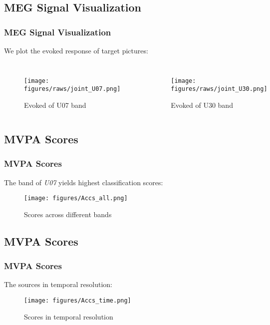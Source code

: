 \documentclass[aspectratio=169]{beamer}
\begin{document}
\subsection{MEG Signal Visualization}
\begin{frame}
    \frametitle{MEG Signal Visualization}
    We plot the evoked response of target pictures:

    \begin{columns}
        \begin{figure}[h]
            \centering
            \texttt{[image: figures/raws/joint\_U07.png]}
            \caption{Evoked of U07 band}
        \end{figure}

        \begin{figure}[!h]
            \centering
            \texttt{[image: figures/raws/joint\_U30.png]}
            \caption{Evoked of U30 band}
        \end{figure}

    \end{columns}

\end{frame}

\subsection{MVPA Scores}
\begin{frame}
    \frametitle{MVPA Scores}
    The band of \emph{U07} yields highest classification scores:
    \begin{figure}[h]
        \centering
        \texttt{[image: figures/Accs\_all.png]}
        \caption{Scores across different bands}
    \end{figure}
\end{frame}

\subsection{MVPA Scores}
\begin{frame}
    \frametitle{MVPA Scores}
    The sources in temporal resolution:
    \begin{figure}[h]
        \centering
        \texttt{[image: figures/Accs\_time.png]}
        \caption{Scores in temporal resolution}
    \end{figure}
\end{frame}
\end{document}
